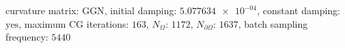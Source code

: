 curvature matrix: $\text{GGN}$, initial damping: $\num[scientific-notation=true]{5.077634e-04}$, constant damping: $\text{yes}$, maximum CG iterations: $\num[scientific-notation=false]{163}$, $N_{\Omega}$: $\num[scientific-notation=false]{1172}$, $N_{\partial\Omega}$: $\num[scientific-notation=false]{1637}$, batch sampling frequency: $\num[scientific-notation=false]{5440}$
